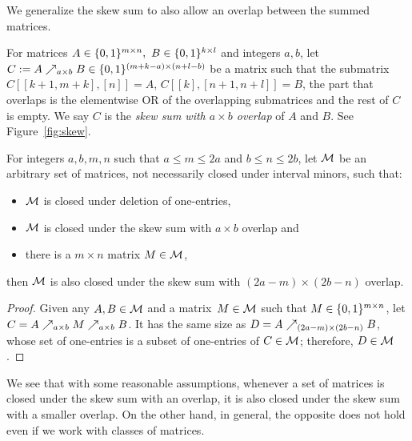 We generalize the skew sum to also allow an overlap between the summed matrices.

\begin{defn}
For matrices $A\in\{0,1\}^{m\times n},\ B\in\{0,1\}^{k\times l}$ and integers $a,b$, let $C:=A\nearrow_{a\times b}B\in\{0,1\}^{(m+k-a)\times(n+l-b)}$ be a matrix such that the submatrix~$C[[k+1,m+k],[n]]=A$, $C[[k],[n+1,n+l]]=B$, the part that overlaps is the elementwise OR of the overlapping submatrices and the rest of $C$ is empty. We say $C$ is the \emph{skew sum with $a\times b$ overlap} of $A$ and $B$. See Figure~\ref{fig:skew}.
\end{defn}

\begin{prop}
\label{prop:smaller}
For integers $a,b,m,n$ such that $a\leq m\leq2a$ and $b\leq n\leq2b$, let $\mathcal{M}$ be an arbitrary set of matrices, not necessarily closed under interval minors, such that:
\begin{itemize}
	\item $\mathcal{M}$ is closed under deletion of one-entries,
	\item $\mathcal{M}$ is closed under the skew sum with $a\times b$ overlap and
	\item there is a $m\times n$ matrix $M\in\mathcal{M}$,
\end{itemize}
then $\mathcal{M}$ is also closed under the skew sum with $(2a-m)\times(2b-n)$ overlap.
\end{prop}
\begin{proof}
Given any $A,B\in\mathcal{M}$ and a matrix~$M\in\mathcal{M}$ such that $M\in\{0,1\}^{m\times n}$, let $C=A\nearrow_{a\times b}M\nearrow_{a\times b}B$. It has the same size as $D=A\nearrow_{(2a-m)\times(2b-n)}B$, whose set of one-entries is a subset of one-entries of $C\in\mathcal{M}$; therefore, $D\in\mathcal{M}$.
\end{proof}

We see that with some reasonable assumptions, whenever a set of matrices is closed under the skew sum with an overlap, it is also closed under the skew sum with a smaller overlap. On the other hand, in general, the opposite does not hold even if we work with classes of matrices.

